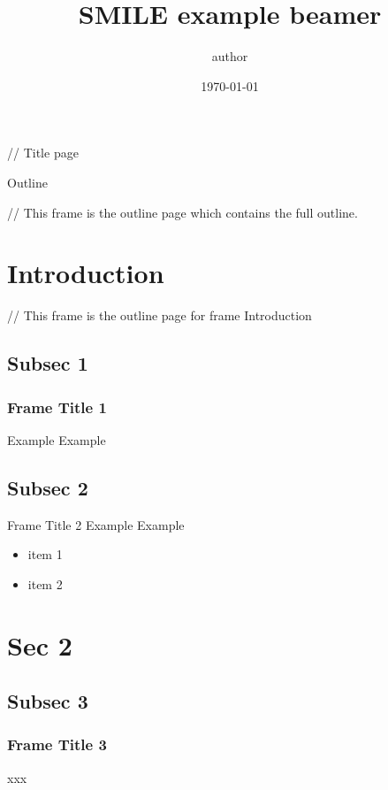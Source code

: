 \documentclass[aspectratio=1610,hyperref={colorlinks,unicode,linkcolor=blue,anchorcolor=blue,citecolor=green,filecolor=black,urlcolor=blue}]{beamer}
\title{SMILE example beamer}
\author{author}
\date\today
\begin{document}
\begin{frame}[plain]
  \titlepage

  // Title page
\end{frame}


\begin{frame}{Outline}
  \tableofcontents

  // This frame is the outline page which contains the full outline.
  \end{frame}

\section{Introduction}

\begin{frame}
  \tableofcontents[currentsection, subsectionstyle=show/show/hide]

  // This frame is the outline page for frame Introduction
\end{frame}


\subsection {Subsec 1}
\begin{frame}
  \frametitle{Frame Title 1}
  Example Example
\end{frame}


\subsection {Subsec 2}
\begin{frame}{Frame Title 2}
  Example Example

\begin{itemize}
    \item item 1
    \item item 2
\end{itemize}

\end{frame}


\section {Sec 2}

\begin{frame}
  \tableofcontents[currentsection, subsectionstyle=show/show/hide]
\end{frame}

\subsection {Subsec 3}
\begin{frame}
  \frametitle{Frame Title 3}
xxx
\end{frame}
\end{document}
